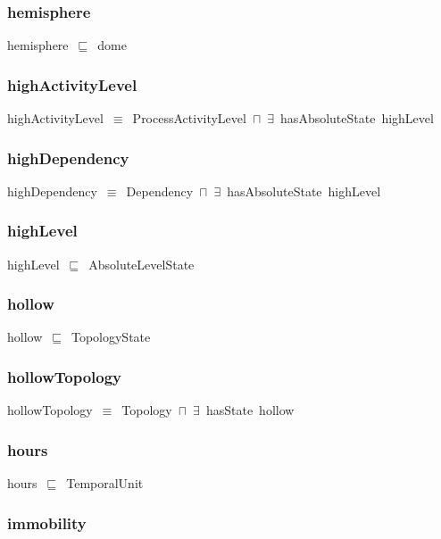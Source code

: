\documentclass{article}
\begin{document}
\subsubsection*{hemisphere}

hemisphere~\ensuremath{\sqsubseteq}~dome~

\subsubsection*{highActivityLevel}

highActivityLevel~\ensuremath{\equiv}~ProcessActivityLevel~\ensuremath{\sqcap}~\ensuremath{\exists}~hasAbsoluteState~highLevel

\subsubsection*{highDependency}

highDependency~\ensuremath{\equiv}~Dependency~\ensuremath{\sqcap}~\ensuremath{\exists}~hasAbsoluteState~highLevel

\subsubsection*{highLevel}

highLevel~\ensuremath{\sqsubseteq}~AbsoluteLevelState~

\subsubsection*{hollow}

hollow~\ensuremath{\sqsubseteq}~TopologyState~

\subsubsection*{hollowTopology}

hollowTopology~\ensuremath{\equiv}~Topology~\ensuremath{\sqcap}~\ensuremath{\exists}~hasState~hollow

\subsubsection*{hours}

hours~\ensuremath{\sqsubseteq}~TemporalUnit~

\subsubsection*{immobility}
\end{document}
